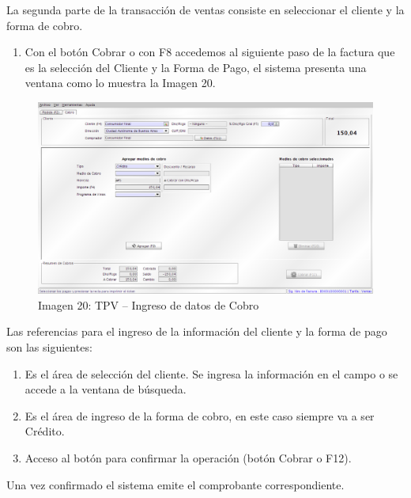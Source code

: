 \documentclass[letterpaper,10pt,spanish]{sphinxmanual}
\begin{document}
La segunda parte de la transacción de ventas consiste en seleccionar el cliente y la forma de cobro.
\begin{enumerate}
\item {} 
Con el botón Cobrar o con F8 accedemos al siguiente paso de la factura que es la selección del Cliente y la Forma de Pago, el sistema presenta una ventana como lo muestra la Imagen 20.

\end{enumerate}
\begin{figure}[htbp]
\centering
\capstart

\includegraphics{ly_tpv_20.png}
\caption{Imagen 20: TPV – Ingreso de datos de Cobro}\end{figure}

Las referencias para el ingreso de la información del cliente y la forma de pago son las siguientes:
\begin{enumerate}
\item {} 
Es el área de selección del cliente. Se ingresa la información en el campo o se accede a la ventana de búsqueda.

\item {} 
Es el área de ingreso de la forma de cobro, en este caso siempre va a ser Crédito.

\item {} 
Acceso al botón para confirmar la operación (botón Cobrar o F12).

\end{enumerate}

Una vez confirmado el sistema emite el comprobante correspondiente.
\end{document}

